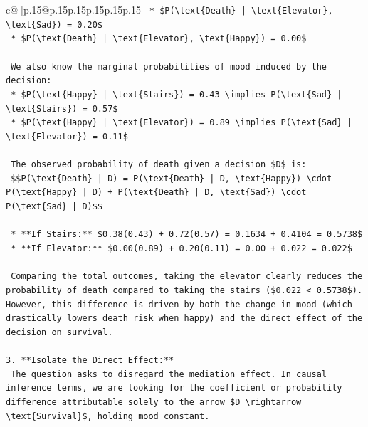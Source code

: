 \documentclass{article}
\begin{document}
{\begin{supertabular}{c@{$\;$}|p{.15\linewidth}@{}p{.15\linewidth}p{.15\linewidth}p{.15\linewidth}p{.15\linewidth}p{.15\linewidth}}
{{{\texttt{    *   \$P(\textbackslash{}text\{Death\} | \textbackslash{}text\{Elevator\}, \textbackslash{}text\{Sad\}) = 0.20\$} \\
\texttt{    *   \$P(\textbackslash{}text\{Death\} | \textbackslash{}text\{Elevator\}, \textbackslash{}text\{Happy\}) = 0.00\$} \\
\\ 
\texttt{    We also know the marginal probabilities of mood induced by the decision:} \\
\texttt{    *   \$P(\textbackslash{}text\{Happy\} | \textbackslash{}text\{Stairs\}) = 0.43 \textbackslash{}implies P(\textbackslash{}text\{Sad\} | \textbackslash{}text\{Stairs\}) = 0.57\$} \\
\texttt{    *   \$P(\textbackslash{}text\{Happy\} | \textbackslash{}text\{Elevator\}) = 0.89 \textbackslash{}implies P(\textbackslash{}text\{Sad\} | \textbackslash{}text\{Elevator\}) = 0.11\$} \\
\\ 
\texttt{    The observed probability of death given a decision \$D\$ is:} \\
\texttt{    \$\$P(\textbackslash{}text\{Death\} | D) = P(\textbackslash{}text\{Death\} | D, \textbackslash{}text\{Happy\}) \textbackslash{}cdot P(\textbackslash{}text\{Happy\} | D) + P(\textbackslash{}text\{Death\} | D, \textbackslash{}text\{Sad\}) \textbackslash{}cdot P(\textbackslash{}text\{Sad\} | D)\$\$} \\
\\ 
\texttt{    *   **If Stairs:** \$0.38(0.43) + 0.72(0.57) = 0.1634 + 0.4104 = 0.5738\$} \\
\texttt{    *   **If Elevator:** \$0.00(0.89) + 0.20(0.11) = 0.00 + 0.022 = 0.022\$} \\
\\ 
\texttt{    Comparing the total outcomes, taking the elevator clearly reduces the probability of death compared to taking the stairs (\$0.022 < 0.5738\$). However, this difference is driven by both the change in mood (which drastically lowers death risk when happy) and the direct effect of the decision on survival.} \\
\\ 
\texttt{3.  **Isolate the Direct Effect:**} \\
\texttt{    The question asks to disregard the mediation effect. In causal inference terms, we are looking for the coefficient or probability difference attributable solely to the arrow \$D \textbackslash{}rightarrow \textbackslash{}text\{Survival\}\$, holding mood constant.} \\
}}}
\end{supertabular}}
\end{document}
